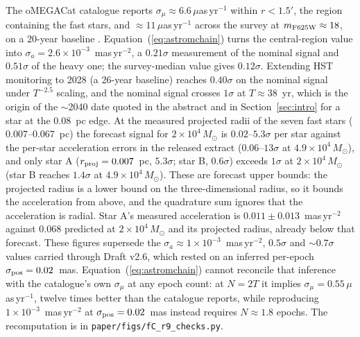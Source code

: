 \documentclass[11pt]{article}
\newcommand{\msun}{\ensuremath{M_\odot}}
\begin{document}
The oMEGACat catalogue reports $\sigma_{\mu} \approx 6.6\,\mu$as\,yr$^{-1}$ within $r < 1.5'$, the region containing the fast stars, and $\approx 11\,\mu$as\,yr$^{-1}$ across the survey at $m_{\rm F625W} \approx 18$, on a 20-year baseline \citep{Haberle2024oMEGACatII}. Equation~(\ref{eq:astromchain}) turns the central-region value into $\sigma_{a} = 2.6\times10^{-3}$~mas\,yr$^{-2}$, a $0.21\sigma$ measurement of the nominal signal and $0.51\sigma$ of the heavy one; the survey-median value gives $0.12\sigma$. Extending HST monitoring to 2028 (a 26-year baseline) reaches $0.40\sigma$ on the nominal signal under $T^{-2.5}$ scaling, and the nominal signal crosses $1\sigma$ at $T \approx 38$~yr, which is the origin of the $\sim$2040 date quoted in the abstract and in Section~\ref{sec:intro} for a star at the $0.08$~pc edge. At the measured projected radii of the seven fast stars ($0.007$--$0.067$~pc) the forecast signal for $2\times10^{4}\,\msun$ is $0.02$--$5.3\sigma$ per star against the per-star acceleration errors in the released extract ($0.06$--$13\sigma$ at $4.9\times10^{4}\,\msun$), and only star A ($r_{\rm proj}=0.007$~pc, $5.3\sigma$; star B, $0.6\sigma$) exceeds $1\sigma$ at $2\times10^{4}\,\msun$ (star B reaches $1.4\sigma$ at $4.9\times10^{4}\,\msun$). These are forecast upper bounds: the projected radius is a lower bound on the three-dimensional radius, so it bounds the acceleration from above, and the quadrature sum ignores that the acceleration is radial. Star A's measured acceleration is $0.011 \pm 0.013$~mas\,yr$^{-2}$ against $0.068$ predicted at $2\times10^{4}\,\msun$ and its projected radius, already below that forecast. These figures supersede the $\sigma_{a} \approx 1\times10^{-3}$~mas\,yr$^{-2}$, $0.5\sigma$ and $\sim$$0.7\sigma$ values carried through Draft v2.6, which rested on an inferred per-epoch $\sigma_{\rm pos} = 0.02$~mas. Equation~(\ref{eq:astromchain}) cannot reconcile that inference with the catalogue's own $\sigma_{\mu}$ at any epoch count: at $N = 2T$ it implies $\sigma_{\mu} = 0.55\,\mu$as\,yr$^{-1}$, twelve times better than the catalogue reports, while reproducing $1\times10^{-3}$~mas\,yr$^{-2}$ at $\sigma_{\rm pos} = 0.02$~mas instead requires $N \approx 1.8$ epochs. The recomputation is in \texttt{paper/figs/fC\_r9\_checks.py}.
\end{document}
